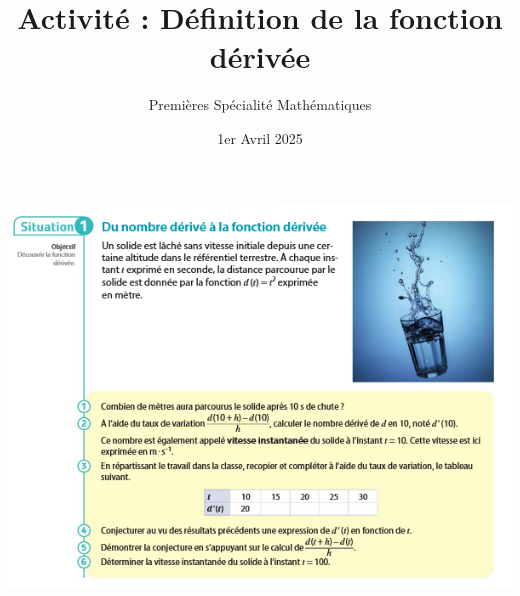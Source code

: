 \documentclass{article}
\title{Activité : Définition de la fonction dérivée}
\author{Premières Spécialité Mathématiques}
\date{1er Avril 2025}
\begin{document}
\maketitle
\begin{center}
\includegraphics[width=\textwidth]{Activite.png}
\end{center}
\end{document}
